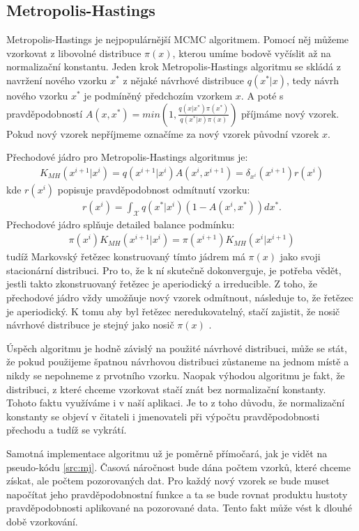\documentclass[czech,master,public,dept470,male,cpdeclaration,oneside, python]{diploma}
\begin{document}
\subsection{Metropolis-Hastings}
Metropolis-Hastings je nejpopulárnější MCMC algoritmem. Pomocí něj můžeme vzorkovat z libovolné distribuce  $\pi(x)$, kterou umíme bodově vyčíslit až na normalizační konstantu. Jeden krok Metropolis-Hastings algoritmu se skládá z navržení nového vzorku $x^*$ z nějaké návrhové distribuce $q(x^* | x)$, tedy návrh nového vzorku $x^*$ je podmíněný předchozím vzorkem $x$. A poté s pravděpodobností  $A(x, x^*) = min(1, \frac{q(x | x^*)\pi(x^*)}{q(x^* | x)\pi(x)})$ příjmáme nový vzorek. Pokud nový vzorek nepříjmeme označíme za nový vzorek původní vzorek $x$. \par 
Přechodové jádro pro Metropolis-Hastings algoritmus je:
\begin{align}
K_{MH}(x^{i+1} | x^{i}) = q(x^{i+1} | x^i) A(x^i, x^{i+1}) = \delta_{x^i}(x^{i+1})r(x^{i})
\end{align}
kde $r(x^i)$ popisuje pravděpodobnost odmítnutí vzorku:
\begin{align}
r(x^i) = \int_{\mathcal{X}} q(x^* | x^i)(1 - A(x^i, x^*))dx^*.
\end{align}
Přechodové jádro splňuje detailed balance podmínku:
\begin{align}
 \pi(x^i)K_{MH}(x^{i+1}| x^i) = \pi(x^{i+1})K_{MH}(x^i | x^{i+1})
\end{align}
tudíž Markovský řetězec konstruovaný tímto jádrem má $\pi(x)$ jako svoji stacionární distribuci. Pro to, že k ní skutečně dokonverguje, je potřeba vědět, jestli takto zkonstruovaný řetězec je aperiodický a irreducible. Z toho, že přechodové jádro vždy umožňuje nový vzorek odmítnout, následuje to, že řetězec je aperiodický. K tomu aby byl řetězec neredukovatelný, stačí zajistit, že nosič návrhové distribuce je stejný jako nosič  $\pi(x)$ \cite{andrieu2003introduction}. \par 
Úspěch algoritmu je hodně závislý na použité návrhové distribuci, může se stát, že pokud použijeme špatnou návrhovou distribuci zůstaneme na jednom místě a nikdy se nepohneme z prvotního vzorku. Naopak výhodou algoritmu je fakt, že distribuci, z které chceme vzorkovat stačí znát bez normalizační konstanty. Tohoto faktu využíváme i v naší aplikaci. Je to z toho důvodu, že normalizační konstanty se objeví v čitateli i jmenovateli při výpočtu pravděpodobnosti přechodu a tudíž se vykrátí. \par
Samotná implementace algoritmu už je poměrně přímočará, jak je vidět na pseudo-kódu \ref{src:mj}. Časová náročnost bude dána počtem vzorků, které chceme získat, ale počtem pozorovaných dat. Pro každý nový vzorek se bude muset napočítat jeho pravděpodobnostní funkce a ta se bude rovnat produktu hustoty pravděpodobnosti aplikované na pozorované data. Tento fakt může vést k dlouhé době vzorkování.
\end{document}
